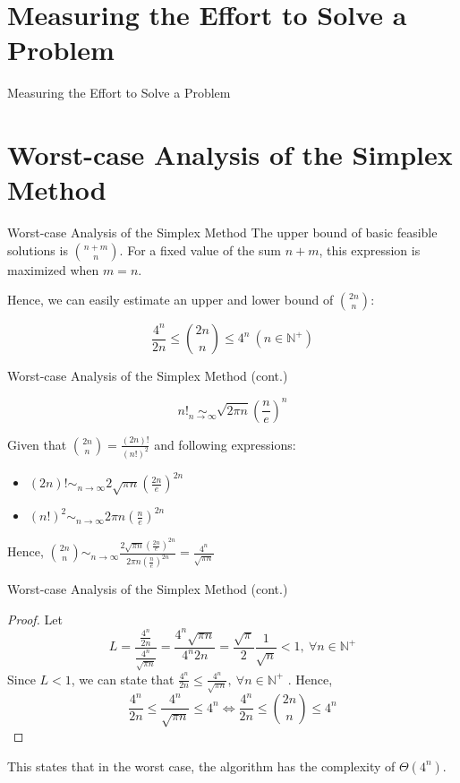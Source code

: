 \documentclass[10pt]{beamer}
\begin{document}
\section{Measuring the Effort to Solve a Problem}
\begin{frame}{Measuring the Effort to Solve a Problem}

\end{frame}

\section{Worst-case Analysis of the Simplex Method}
\begin{frame}{Worst-case Analysis of the Simplex Method}
The upper bound of basic feasible solutions is $\displaystyle {n + m \choose n}$. For a fixed value of the sum $n + m$, this expression is maximized when $m = n$.

Hence, we can easily estimate an upper and lower bound of $\displaystyle {2n \choose n}$:

$$
\frac{4^{n}}{2n} \leq {2n \choose n} \leq 4^{n} \ (n \in \mathbb{N^+})
$$\cite{Vanderbei2020}
\end{frame}
\begin{frame}{Worst-case Analysis of the Simplex Method (cont.)}
\begin{theorem}
$$
\displaystyle
n! \operatorname*{\sim}_{n\to\infty} \sqrt{2\pi n}\left(\frac{n}{e}\right)^n
$$
\end{theorem}
Given that $\displaystyle {2n \choose n} = \frac{(2n)!}{(n!)^2}$ and following expressions:
\begin{itemize}
\item $\displaystyle (2n)! \operatorname*{\sim}_{n\to\infty} 2\sqrt{\pi n} \left(\frac{2n}{e}\right)^{2n}$ 
\item $\displaystyle (n!)^2 \operatorname*{\sim}_{n\to\infty} 2\pi n \left(\frac{n}{e}\right)^{2n}$ 
\end{itemize}
Hence, $\displaystyle {2n \choose n} \operatorname*{\sim}_{n\to\infty} \frac{2\sqrt{\pi n} \left(\frac{2n}{e}\right)^{2n}}{2\pi n \left(\frac{n}{e}\right)^{2n}} =  \frac{4^n}{\sqrt{\pi n}}$
\end{frame}

\begin{frame}{Worst-case Analysis of the Simplex Method (cont.)}
\begin{proof}
Let
$$
\displaystyle
L = \frac{\frac{4^n}{2n}}{\frac{4^n}{\sqrt{\pi n}}} = \frac{4^n\sqrt{\pi n}}{4^n 2n} = \frac{\sqrt{\pi}}{2} \frac{1}{\sqrt{n}} < 1,\ \forall n \in \mathbb{N^+}
$$
Since $L < 1$, we can state that $\frac{4^n}{2n} \leq \frac{4^n}{\sqrt{\pi n}},\ \forall n \in \mathbb{N^+}
$
. Hence,
$$
\displaystyle
\frac{4^n}{2n} \leq \frac{4^n}{\sqrt{\pi n}} \leq 4^n \iff \frac{4^n}{2n} \leq {2n \choose n} \leq 4^n
$$
\end{proof}
This states that in the worst case, the algorithm has the complexity of $\Theta(4^n)$.
\end{frame}
\end{document}
